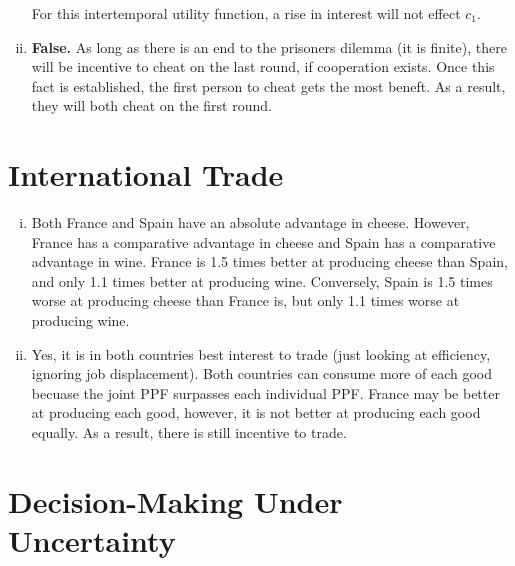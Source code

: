 \documentclass{article}
\begin{document}
\begin{enumerate}[i.]
        For this intertemporal utility function, a rise in interest will not
        effect $c_{1}$.

    \item \textbf{False.} As long as there is an end to the prisoners dilemma
        (it is finite), there will be incentive to cheat on the last round, if
        cooperation exists. Once this fact is established, the first person to
        cheat gets the most beneft. As a result, they will both cheat on the
        first round.

\end{enumerate}

\section{ International Trade }

\begin{enumerate}[i.]
    \item Both France and Spain have an absolute advantage in cheese.  However,
        France has a comparative advantage in cheese and Spain has a comparative
        advantage in wine. France is 1.5 times better at producing cheese than
        Spain, and only 1.1 times better at producing wine. Conversely,
        Spain is 1.5 times worse at producing cheese than France is, but only
        1.1 times worse at producing wine.

    \item Yes, it is in both countries best interest to trade (just looking at
        efficiency, ignoring job displacement). Both countries can consume more
        of each good becuase the joint PPF surpasses each individual PPF. France
        may be better at producing each good, however, it is not better at
        producing each good equally. As a result, there is still incentive to
        trade.

\end{enumerate}

\section{ Decision-Making Under Uncertainty }
\end{document}
